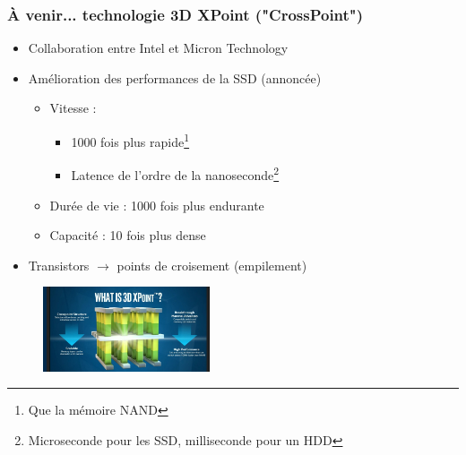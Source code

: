 \begin{frame}
\frametitle{À venir... technologie 3D XPoint ("CrossPoint") \cite{XPoint}}
\begin{itemize}
\item Collaboration entre Intel et Micron Technology
\item Amélioration des performances de la SSD (annoncée)
\begin{itemize}
\item Vitesse :
\begin{itemize}
\item 1000 fois plus rapide\footnote{Que la mémoire NAND}
\item Latence de l'ordre de la nanoseconde\footnote{Microseconde pour les SSD, milliseconde pour un HDD}
\end{itemize}

\item Durée de vie : 1000 fois plus endurante
\item Capacité : 10 fois plus dense
\end{itemize}
\item Transistors $\rightarrow$  points de croisement (empilement)
\end{itemize}

\begin{figure}[htbp]
\begin{center}
\includegraphics[height=2.5cm]{../illustration/XPoint.jpg}
\label{default}
\end{center}
\end{figure}

\end{frame}

